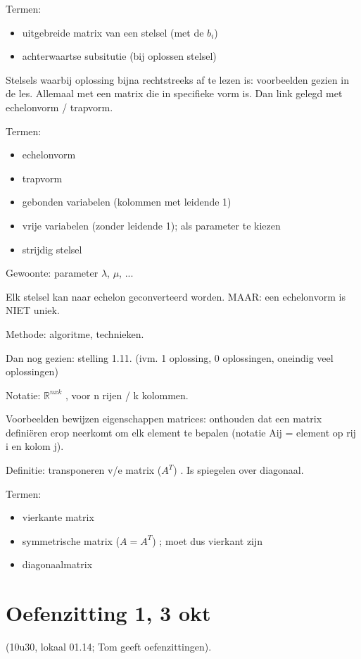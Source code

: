 \documentclass{article}
\begin{document}
Termen: 
\begin{itemize}
\item uitgebreide matrix van een stelsel (met de $b_i$) 
\item achterwaartse subsitutie (bij oplossen stelsel) 
\end{itemize}

Stelsels waarbij oplossing bijna rechtstreeks af te lezen is:  voorbeelden gezien in de les. Allemaal met een matrix die in specifieke vorm is. Dan link gelegd met echelonvorm / trapvorm. 

Termen:
\begin{itemize}
\item echelonvorm
\item trapvorm
\item gebonden variabelen (kolommen met leidende 1) 
\item vrije variabelen (zonder leidende 1); als parameter te kiezen
\item strijdig stelsel
\end{itemize}

Gewoonte: parameter $\lambda$, $\mu$, ...

Elk stelsel kan naar echelon geconverteerd worden. MAAR: een echelonvorm is NIET uniek. 

Methode: algoritme, technieken. 

Dan nog gezien: stelling 1.11. (ivm. 1 oplossing, 0 oplossingen, oneindig veel oplossingen)

Notatie: $\mathbb{R}^{nxk}$ , voor n rijen / k kolommen. 

Voorbeelden bewijzen eigenschappen matrices: onthouden dat een matrix defini{\"e}ren erop neerkomt om elk element te bepalen (notatie Aij = element op rij i en kolom j). 

Definitie: transponeren v/e matrix ($A^T$) . Is spiegelen over diagonaal. 

Termen:
\begin{itemize}
\item vierkante matrix
\item symmetrische matrix ($A = A^T$) ; moet dus vierkant zijn
\item diagonaalmatrix
\end{itemize}

\section{Oefenzitting 1, 3 okt}

(10u30, lokaal 01.14; Tom geeft oefenzittingen). 
\end{document}

